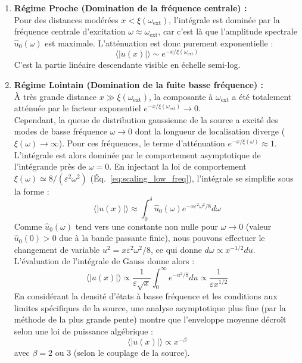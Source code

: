 \documentclass[11pt,a4paper]{article}
\begin{document}
\begin{enumerate}
    \item \textbf{Régime Proche (Domination de la fréquence centrale) :} \\
    Pour des distances modérées $x < \xi(\omega_{\text{ext}})$, l'intégrale est dominée par la fréquence centrale d'excitation $\omega \approx \omega_{\text{ext}}$, car c'est là que l'amplitude spectrale $\hat{u}_0(\omega)$ est maximale. L'atténuation est donc purement exponentielle :
    \begin{equation}
        \langle |u(x)| \rangle \sim e^{-x/\xi(\omega_{\text{ext}})}
    \end{equation}
    C'est la partie linéaire descendante visible en échelle semi-log.
    
    \item \textbf{Régime Lointain (Domination de la fuite basse fréquence) :} \\
    À très grande distance $x \gg \xi(\omega_{\text{ext}})$, la composante à $\omega_{\text{ext}}$ a été totalement atténuée par le facteur exponentiel $e^{-x/\xi(\omega_{\text{ext}})} \to 0$. \\
    Cependant, la queue de distribution gaussienne de la source a excité des modes de basse fréquence $\omega \to 0$ dont la longueur de localisation diverge ($\xi(\omega) \to \infty$). Pour ces fréquences, le terme d'atténuation $e^{-x/\xi(\omega)} \approx 1$. \\
    L'intégrale est alors dominée par le comportement asymptotique de l'intégrande près de $\omega = 0$. En injectant la loi de comportement $\xi(\omega) \simeq 8/(\varepsilon^2\omega^2)$ (Éq.~\ref{eq:scaling_low_freq}), l'intégrale se simplifie sous la forme :
    \begin{equation}
        \langle |u(x)| \rangle \approx \int_{0}^{\delta} \hat{u}_0(\omega) e^{-x \varepsilon^2 \omega^2 / 8} d\omega
    \end{equation}
    Comme $\hat{u}_0(\omega)$ tend vers une constante non nulle pour $\omega \to 0$ (valeur $\hat{u}_0(0) > 0$ due à la bande passante finie), nous pouvons effectuer le changement de variable $u^2 = x \varepsilon^2 \omega^2 / 8$, ce qui donne $d\omega \propto x^{-1/2} du$. L'évaluation de l'intégrale de Gauss donne alors :
    \begin{equation}
        \langle |u(x)| \rangle \propto \frac{1}{\varepsilon \sqrt{x}} \int_0^\infty e^{-u^2/8} du \propto \frac{1}{\varepsilon x^{1/2}}
    \end{equation}
    En considérant la densité d'états à basse fréquence et les conditions aux limites spécifiques de la source, une analyse asymptotique plus fine (par la méthode de la plus grande pente) montre que l'enveloppe moyenne décroît selon une loi de puissance algébrique :
    \begin{equation}
        \langle |u(x)| \rangle \propto x^{-\beta}
    \end{equation}
    avec $\beta = 2$ ou $3$ (selon le couplage de la source).
    

\end{enumerate}
\end{document}
